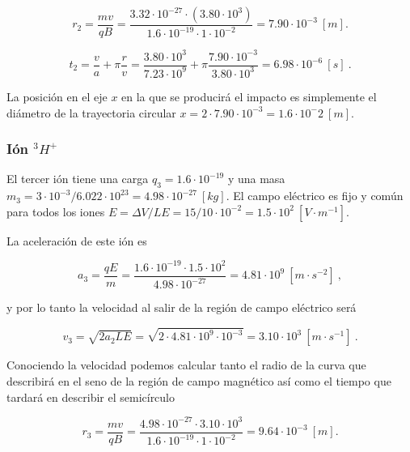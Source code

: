 \documentclass[journal]{IEEEtran}
\begin{document}
\begin{equation}
r_2 = \displaystyle\frac{mv}{qB} = \displaystyle\frac{3.32\cdot 10^{-27} \cdot (3.80\cdot 10^3)}{1.6\cdot 10^{-19}\cdot 1 \cdot 10^{-2}} = 7.90\cdot 10^{-3}~[m].
\end{equation}

\begin{equation}
t_2 = \displaystyle\frac{v}{a} + \pi \displaystyle\frac{r}{v} = \displaystyle\frac{3.80 \cdot 10^3}{7.23 \cdot 10^{9}} + \pi \displaystyle\frac{7.90 \cdot 10^{-3}}{3.80 \cdot 10^3} = 6.98 \cdot 10^{-6}~[s]~.
\end{equation}

La posición en el eje $x$ en la que se producirá el impacto es simplemente el diámetro de la trayectoria circular $x = 2\cdot7.90 \cdot 10^{-3} = 1.6 \cdot 10^-2~[m]$.

\subsubsection{Ión $^3H^+$}

El tercer ión tiene una carga $q_3 = 1.6\cdot 10^{-19}$ y una masa $m_3 = 3\cdot 10^{-3} / 6.022\cdot 10^{23} = 4.98\cdot 10^{-27}~[kg]$. El campo eléctrico es fijo y común para todos los iones $E = \Delta V / LE = 15 / 10\cdot 10^{-2} = 1.5\cdot 10^2~[V\cdot m^{-1}]$.

La aceleración de este ión es

\begin{equation}
a_3 = \displaystyle\frac{qE}{m} = \displaystyle\frac{1.6\cdot 10^{-19}\cdot 1.5\cdot 10^{2}}{4.98\cdot 10^{-27}} = 4.81 \cdot 10^{9}~[m\cdot s^{-2}]~,
\end{equation}

y por lo tanto la velocidad al salir de la región de campo eléctrico será

\begin{equation}
v_3 = \sqrt{2a_2LE} = \sqrt{2\cdot 4.81 \cdot 10^{9} \cdot 10^{-3}} = 3.10 \cdot 10^3~[m\cdot s^{-1}]~.
\end{equation}

Conociendo la velocidad podemos calcular tanto el radio de la curva que describirá en el seno de la región de campo magnético así como el tiempo que tardará en describir el semicírculo

\begin{equation}
r_3 = \displaystyle\frac{mv}{qB} = \displaystyle\frac{4.98\cdot 10^{-27} \cdot 3.10\cdot 10^3}{1.6\cdot 10^{-19}\cdot 1 \cdot 10^{-2}} = 9.64\cdot 10^{-3}~[m].
\end{equation}
\end{document}

